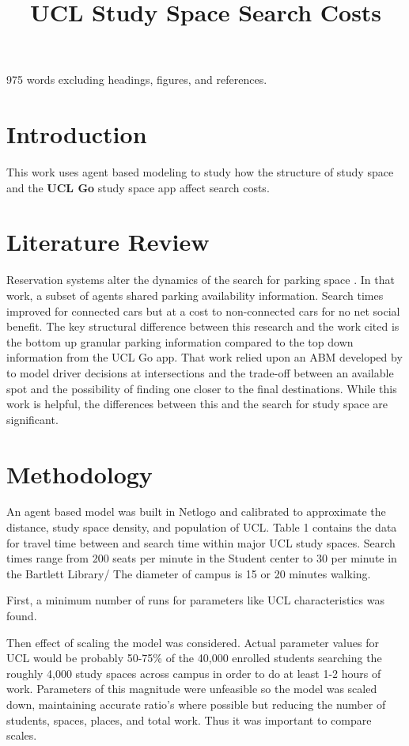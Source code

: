 \documentclass[11pt]{article} %
\title{\vspace{-2.0cm}UCL Study Space Search Costs}
\begin{document}
\maketitle

975 words excluding headings, figures, and references. \\

\section{Introduction}

This work uses agent based modeling to study how the structure of study space and the \textbf{UCL Go} study space app affect search costs.

\section{Literature Review}

Reservation systems alter the dynamics of the search for parking space \parencite{TasseronG.2017Upsr}. In that work, a subset of agents shared parking availability information. Search times improved for connected cars but  at a cost to non-connected cars for no net social benefit. The key structural difference between this research  and the work cited is the bottom up granular parking information compared to the top down information from the UCL Go app. That work relied upon an ABM developed by \cite{BenensonItzhak2008PAam} to model driver decisions at intersections and the trade-off between an available spot and the possibility of finding one closer to the final destinations. While this work is helpful, the differences between this and the search for study space are significant.  

\section{Methodology}

An agent based model was built in Netlogo and calibrated to approximate the distance, study space density, and  population of UCL. Table 1 contains the data for travel time between and search time within major UCL study spaces. Search times range from 200 seats per minute in the Student center to 30 per minute in the Bartlett Library/ The diameter of campus is 15 or 20 minutes walking. 

First, a minimum number of runs for parameters like UCL characteristics was found. 

Then effect of scaling the model was considered. Actual parameter values for UCL would be probably 50-75\% of the 40,000 enrolled students searching the roughly 4,000 study spaces across campus in order to do at least 1-2 hours of work. Parameters of this magnitude were unfeasible so the model was scaled down, maintaining accurate ratio's where possible but reducing the number of students, spaces, places, and total work. Thus it was important to compare scales. 
\end{document}
